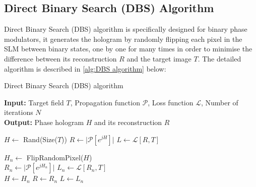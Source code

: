 \subsection{Direct Binary Search (DBS) Algorithm}\label{sec:Direct Binary Search (DBS) Algorithm}
Direct Binary Search (DBS) algorithm \cite{Seldowitz1987} is specifically designed for binary phase modulators, it generates the hologram by randomly flipping each pixel in the SLM between binary states, one by one for many times in order to minimise the difference between its reconstruction $R$ and the target image $T$. The detailed algorithm is described in \cref{alg:DBS algorithm} below:
\begin{algorithm}[H]
  \caption{Direct Binary Search (DBS) algorithm}\label{alg:DBS algorithm}
  \textbf{Input:} Target field $T$, Propagation function $\mathcal{P}$, Loss function $\mathcal{L}$, Number of iterations $N$ \\
  \textbf{Output:} Phase hologram $H$ and its reconstruction $R$
  \begin{algorithmic}
    \State $H \gets$ Rand(Size($T$))
    \State $R \gets \vert \mathcal{P}[e^{jH}] \vert$
    \State $L \gets \mathcal{L} [R, T]$

    \State $H_n \gets$ FlipRandomPixel($H$)\\
    \State $R_n \gets \vert \mathcal{P}[e^{jH_n}] \vert$
    \State $L_n \gets \mathcal{L} [R_n, T]$\\
    \State $H \gets H_n$
    \State $R \gets R_n$
    \State $L \gets L_n$
    \EndIf
    \EndFor
  \end{algorithmic}
\end{algorithm}

